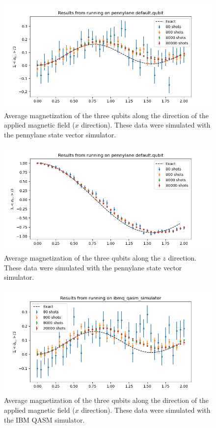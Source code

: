 \documentclass{article}
\begin{document}
\begin{figure}[!htb]
    \centering
        \includegraphics[width=5in]{sigma_x_default.qubit.png}
        \caption{Average magnetization of the three qubits along the direction of the applied magnetic field ($x$ direction). These data were simulated with the pennylane state vector simulator.}
        \label{default.qubit.sigma_x}
\end{figure}

\begin{figure}[!htb]
    \centering
        \includegraphics[width=5in]{sigma_z_default.qubit.png}
        \caption{Average magnetization of the three qubits along the $z$ direction. These data were simulated with the pennylane state vector simulator.}
        \label{default.qubit.sigma_z}
\end{figure}

\begin{figure}[!htb]
    \centering
        \includegraphics[width=5in]{sigma_x_ibmq_qasm_simulator.png}
        \caption{Average magnetization of the three qubits along the direction of the applied magnetic field ($x$ direction). These data were simulated with the IBM QASM simulator.}
        \label{ibmq_qasm.sigma_x}
\end{figure}
\end{document}
